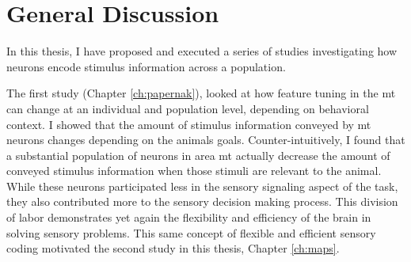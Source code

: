 \chapter{\color{thesisBlue} General Discussion} %

\label{ch:generalDiscussion} %
\glsresetall


In this thesis, I have proposed and executed a series of studies investigating how neurons encode stimulus information across a population. 

The first study (Chapter \ref{ch:papernak}), looked at how feature tuning in the \gls{mt} can change at an individual and population level, depending on behavioral context. I showed that the amount of stimulus information conveyed by \gls{mt} neurons changes depending on the animals goals. Counter-intuitively, I found that a substantial population of neurons in area \gls{mt} actually decrease the amount of conveyed stimulus information when those stimuli are relevant to the animal. While these neurons participated less in the sensory signaling aspect of the task, they also contributed more to the sensory decision making process. This division of labor demonstrates yet again the flexibility and efficiency of the brain in solving sensory problems. This same concept of flexible and efficient sensory coding motivated the second study in this thesis, Chapter \ref{ch:maps}.

